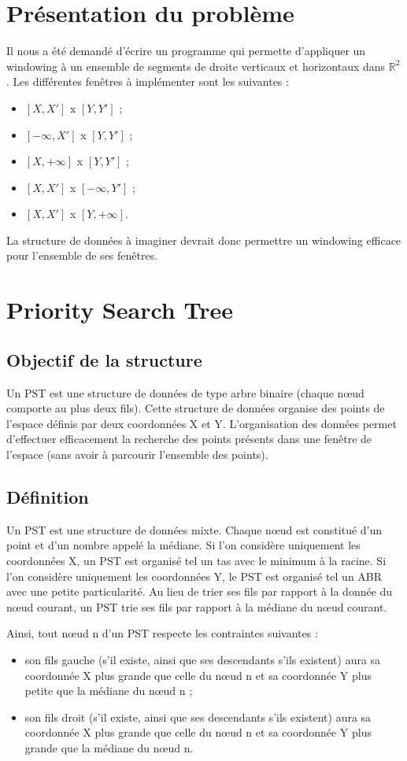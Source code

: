 \documentclass[10pt,a4paper]{article}
\begin{document}
\section{Présentation du problème}
Il nous a été demandé d'écrire un programme qui permette d'appliquer un windowing à un ensemble de segments de droite verticaux et horizontaux dans $\mathbb{R}^2$. Les différentes fenêtres à implémenter sont les suivantes :
\begin{itemize}
	\item $[X, X']$ x $[Y, Y']$ ;
	\item $[-\infty, X']$ x $[Y, Y']$ ;
	\item $[X, +\infty]$ x $[Y, Y']$ ;
	\item $[X, X']$ x $[-\infty, Y']$ ;
	\item $[X, X']$ x $[Y, +\infty]$.
\end{itemize}
La structure de données à imaginer devrait donc permettre un windowing efficace pour l'ensemble de ses fenêtres.


\newpage
\section{Priority Search Tree}

\subsection{Objectif de la structure}
Un PST est une structure de données de type arbre binaire (chaque nœud comporte au plus deux fils). Cette structure de données organise des points de l'espace définis par deux coordonnées X et Y. L'organisation des données permet d'effectuer efficacement la recherche des points présents dans une fenêtre de l'espace (sans avoir à parcourir l'ensemble des points).

\subsection{Définition}
Un PST est une structure de données mixte. Chaque nœud est constitué d'un point et d'un nombre appelé la médiane. Si l'on considère uniquement les coordonnées X, un PST est organisé tel un tas avec le minimum à la racine. Si l'on considère uniquement les coordonnées Y, le PST est organisé tel un ABR avec une petite particularité. Au lieu de trier ses fils par rapport à la donnée du nœud courant, un PST trie ses fils par rapport à la médiane du nœud courant.

Ainsi, tout nœud n d'un PST respecte les contraintes suivantes :
\begin{itemize}
	\item son fils gauche (s'il existe, ainsi que ses descendants s'ils existent) aura sa coordonnée X plus grande que celle du nœud n et sa coordonnée Y plus petite que la médiane du nœud n ;
	\item son fils droit (s'il existe, ainsi que ses descendants s'ils existent) aura sa coordonnée X plus grande que celle du nœud n et sa coordonnée Y plus grande que la médiane du nœud n.
\end{itemize}
\end{document}
